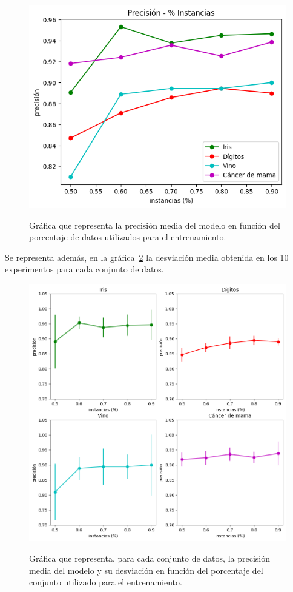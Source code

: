\begin{figure}[h]
	\caption{Gráfica que representa la precisión media del modelo en función del porcentaje de datos utilizados para el entrenamiento.}
	\centering
	\includegraphics[width=\textwidth]{../img/memoria/5_precision-porcentaje_entrenamiento}
	\label{5_precision-porcentaje_entrenamiento}
\end{figure}


Se representa además, en la gráfica~\ref{5_precision-porcentaje_entrenamiento_individual} la desviación media obtenida en los 10 experimentos para cada conjunto de datos.

\begin{figure}[h]
	\caption{Gráfica que representa, para cada conjunto de datos, la precisión media del modelo y su desviación en función del porcentaje del conjunto utilizado para el entrenamiento.}
	\centering
	\includegraphics[width=\textwidth]{../img/memoria/5_precision-porcentaje_entrenamiento_individual}
	\label{5_precision-porcentaje_entrenamiento_individual}
\end{figure}


